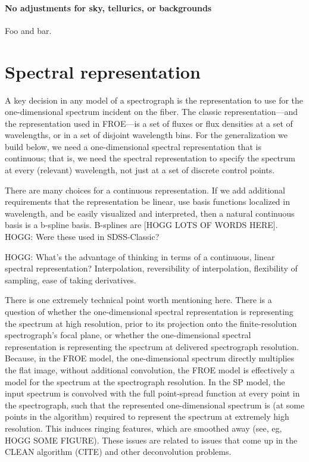 \documentclass[modern]{aastex631}
\begin{document}
\paragraph{No adjustments for sky, tellurics, or backgrounds}
Foo and bar.

\section{Spectral representation}

A key decision in any model of a spectrograph is the representation to use for the one-dimensional spectrum incident on the fiber.
The classic representation---and the representation used in FROE---is a set of fluxes or flux densities at a set of wavelengths, or in a set of disjoint wavelength bins.
For the generalization we build below, we need a one-dimensional spectral representation that is continuous; that is, we need the spectral representation to specify the spectrum at every (relevant) wavelength, not just at a set of discrete control points.

There are many choices for a continuous representation.
If we add additional requirements that the representation be linear, use basis functions localized in wavelength, and be easily visualized and interpreted, then a natural continuous basis is a b-spline basis.
B-splines are [HOGG LOTS OF WORDS HERE].
HOGG: Were these used in SDSS-Classic?

HOGG: What's the advantage of thinking in terms of a continuous, linear spectral representation? Interpolation, reversibility of interpolation, flexibility of sampling, ease of taking derivatives.

There is one extremely technical point worth mentioning here.
There is a question of whether the one-dimensional spectral representation is representing the spectrum at high resolution, prior to its projection onto the finite-resolution spectrograph's focal plane, or whether the one-dimensional spectral representation is representing the spectrum at delivered spectrograph resolution.
Because, in the FROE model, the one-dimensional spectrum directly multiplies the flat image, without additional convolution, the FROE model is effectively a model for the spectrum at the spectrograph resolution.
In the SP model, the input spectrum is convolved with the full point-spread function at every point in the spectrograph, such that the represented one-dimensional spectrum is (at some points in the algorithm) required to represent the spectrum at extremely high resolution.
This induces ringing features, which are smoothed away (see, eg, HOGG SOME FIGURE).
These issues are related to issues that come up in the CLEAN algorithm (CITE) and other deconvolution problems.
\end{document}
